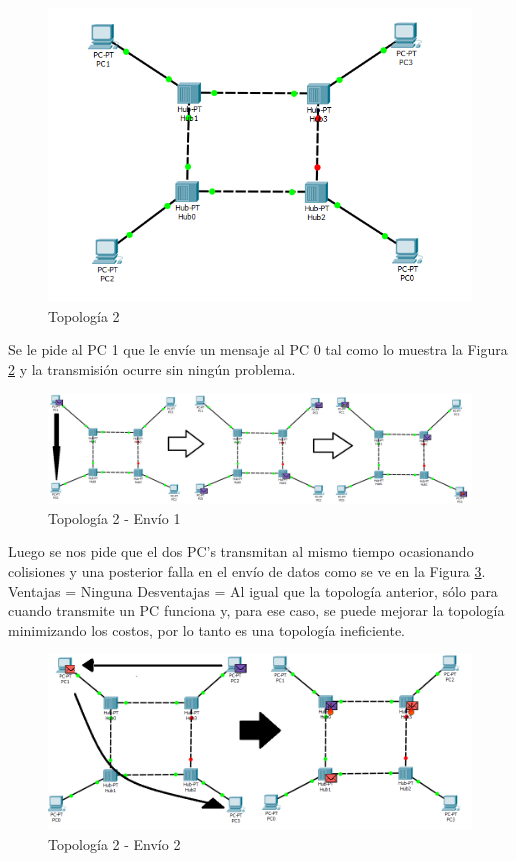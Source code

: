 \documentclass{article}
\begin{document}
\begin{figure}[h!]
\centering
\includegraphics[scale=0.4]{top2.png}
\caption{Topología 2}
\label{fig:top2}
\end{figure}

Se le pide al PC 1 que le envíe un mensaje al PC 0 tal como lo muestra la Figura \ref{fig:topo2} y la transmisión ocurre sin ningún problema.

\begin{figure}[h!]
\centering
\includegraphics[scale=0.3]{top2,1.png}
\caption{Topología 2 - Envío 1}
\label{fig:topo2}
\end{figure}

Luego se nos pide que el dos PC's transmitan al mismo tiempo ocasionando colisiones y una posterior falla en el envío de datos como se ve en la Figura \ref{fig:topopo2}.
\newline Ventajas = Ninguna
\newline Desventajas = Al igual que la topología anterior, sólo para cuando transmite un PC funciona y, para ese caso, se puede mejorar la topología minimizando los costos, por lo tanto es una topología ineficiente.

\begin{figure}[h!]
\centering
\includegraphics[scale=0.25]{top2,2,1.png}
\caption{Topología 2 - Envío 2}
\label{fig:topopo2}
\end{figure}
\end{document}
